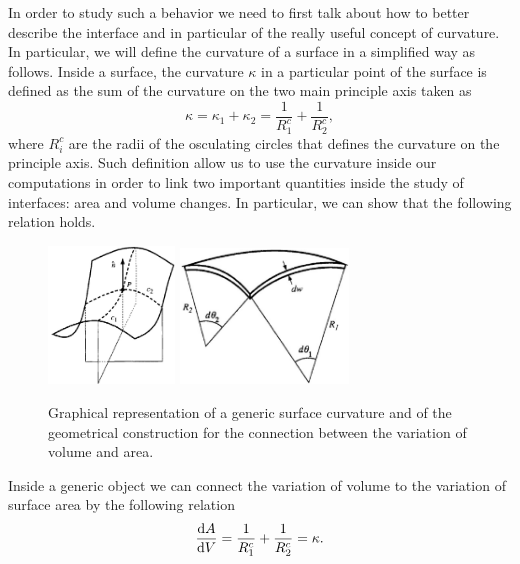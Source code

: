 In order to study such a behavior we need to first talk about how to better describe the interface and in particular of the really useful concept of curvature. In particular, we will define the curvature of a surface in a simplified way as follows.
{
    Inside a surface, the curvature $\kappa$ in a particular point of the surface is defined as the sum of the curvature on the two main principle axis taken as
    \begin{equation}
        \kappa = \kappa_1 + \kappa_2 = \frac{1}{R_1^c} + \frac{1}{R_2^c},
    \end{equation}
    where $R_i^c$ are the radii of the osculating circles that defines the curvature on the principle axis.
}
\noindent
Such definition allow us to use the curvature inside our computations in order to link two important quantities inside the study of interfaces: area and volume changes. In particular, we can show that the following relation holds.
\begin{figure}[t]
    \centering
    \includegraphics[width=0.3\textwidth]{Immagini/Curv.png}
    \hspace{1cm}
    \includegraphics[width=0.4\textwidth]{Immagini/CurvUse.png}
    \caption
    {
        Graphical representation of a generic surface curvature and of the geometrical construction for the connection between the variation of volume and area.
    }
    \label{fig:Curv}
\end{figure}
{
    Inside a generic object we can connect the variation of volume to the variation of surface area by the following relation
    \begin{equation}
        \dv{A}{V} = \frac{1}{R_1^c} + \frac{1}{R_2^c} = \kappa.
    \end{equation}
}

